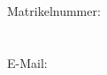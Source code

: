 \begin{titlepage}
\vspace*{\fill}
\begin{center}
	\vspace{1cm}\noindent {\textbf{\thesisType}} \vspace{0.2cm} \\
	\textbf{\Large \myTitle} \\
	\textbf{\mySubTitle} \\
	\dateOfSubmission \\
\end{center}
\vspace*{\fill}

\vspace*{\fill}%
\begin{figure}
	\myName \\
	Matrikelnummer:  \myMatNr \\
	\myStreetAddress \vspace{0.1cm} \\ 
	\myCityAddress \vspace{0.1cm}  \\
	E-Mail: \myEmail \\ 
\end{figure}

\end{titlepage}

